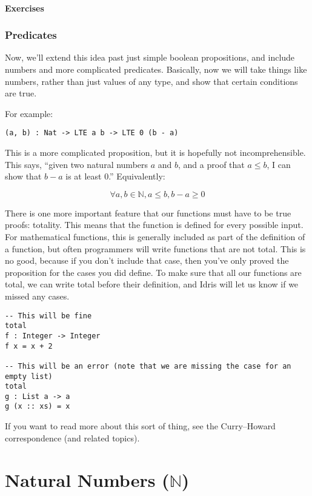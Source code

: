 \documentclass{article}
\begin{document}
\paragraph{Exercises}

\subsubsection{Predicates}
Now, we’ll extend this idea past just simple boolean propositions, and include numbers and more complicated predicates.
Basically, now we will take things like numbers, rather than just values of any type, and show that certain conditions are true.

For example:

\begin{verbatim}
(a, b) : Nat -> LTE a b -> LTE 0 (b - a)
\end{verbatim}

This is a more complicated proposition, but it is hopefully not incomprehensible.
This says, “given two natural numbers $a$ and $b$, and a proof that $a \leq b$, I can show that $b - a$ is at least $0$.”
Equivalently:

\[
    \forall a, b \in \mathbb{N}, a \leq b, b - a \geq 0
\]

There is one more important feature that our functions must have to be true proofs: totality.
This means that the function is defined for every possible input.
For mathematical functions, this is generally included as part of the definition of a function, but often programmers will write functions that are not total.
This is no good, because if you don't include that case, then you've only proved the proposition for the cases you did define.
To make sure that all our functions are total, we can write total before their definition, and Idris will let us know if we missed any cases.

\begin{verbatim}
-- This will be fine
total
f : Integer -> Integer
f x = x + 2

-- This will be an error (note that we are missing the case for an empty list)
total
g : List a -> a
g (x :: xs) = x
\end{verbatim}

If you want to read more about this sort of thing, see the Curry--Howard correspondence (and related topics).

\section{Natural Numbers ($\mathbb{N}$)}
\end{document}
